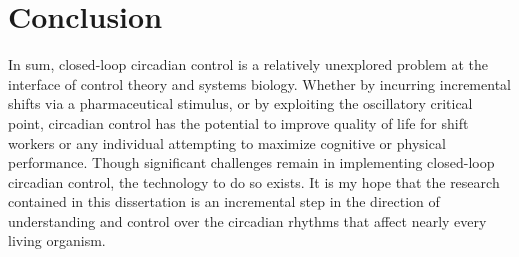 \section{Conclusion}
In sum, closed-loop circadian control is a relatively unexplored problem at the interface of control theory and systems biology. 
Whether by incurring incremental shifts via a pharmaceutical stimulus, or by exploiting the oscillatory critical point, circadian control has the potential to improve quality of life for shift workers or any individual attempting to maximize cognitive or physical performance. 
Though significant challenges remain in implementing closed-loop circadian control, the technology to do so exists.
It is my hope that the research contained in this dissertation is an incremental step in the direction of understanding and control over the circadian rhythms that affect nearly every living organism.













